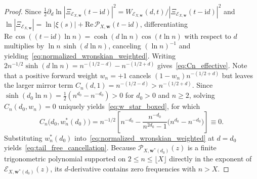 \documentclass[11pt,reqno]{amsart}
\theoremstyle{definition}
\theoremstyle{remark}
\numberwithin{equation}{section}
\newcommand{\ii}{\mathrm{i}}
\newcommand{\Rea}{\mathrm{Re}}
\begin{document}
\begin{proof}
Since $\frac{1}{2}\partial_d\ln|\Xi_{\mathcal{E}_{X,\mathbf{w}}}(t-\ii d)|^2 =\allowbreak W_{\mathcal{E}_{X,\mathbf{w}}}(d,t)/\allowbreak|\Xi_{\mathcal{E}_{X,\mathbf{w}}}(t-\ii d)|^2$ and $\ln|\Xi_{\mathcal{E}_{X,\mathbf{w}}}| =\allowbreak \ln|\xi(s)| +\allowbreak \Rea\,\mathcal{P}_{X,\mathbf{w}}(t-\ii d)$, differentiating $\Rea\,\cos((t-\ii d)\ln n) =\allowbreak \cosh(d\ln n)\cos(t\ln n)$ with respect to $d$ multiplies by $\ln n\,\sinh(d\ln n)$, canceling $(\ln n)^{-1}$ and yielding~\eqref{eq:normalized_wronskian_weighted}. Writing $2n^{-1/2}\sinh(d\ln n) =\allowbreak n^{-(1/2-d)} - n^{-(1/2+d)}$ gives~\eqref{eq:Cn_effective}. Note that a positive forward weight $w_n = +1$ cancels $(1-w_n)n^{-(1/2+d)}$ but leaves the larger mirror term $C_n(d,1) =\allowbreak n^{-(1/2-d)} >\allowbreak n^{-(1/2+d)}$. Since $\sinh(d_0\ln n) =\allowbreak \frac{1}{2}(n^{d_0} - n^{-d_0}) > 0$ for $d_0 > 0$ and $n \ge 2$, solving $C_n(d_0, w_n) = 0$ uniquely yields~\eqref{eq:w_star_boxed}, for which
\[
C_n\bigl(d_0, w_n^*(d_0)\bigr) = n^{-1/2}\left[n^{-d_0} - \frac{n^{-d_0}}{n^{2d_0}-1}\bigl(n^{d_0} - n^{-d_0}\bigr)\right] \equiv 0.
\]
Substituting $w_n^*(d_0)$ into~\eqref{eq:normalized_wronskian_weighted} at $d = d_0$ yields~\eqref{eq:tail_free_cancellation}. Because $\mathcal{P}_{X,\mathbf{w}^*(d_0)}(z)$ is a finite trigonometric polynomial supported on $2 \le n \le \lfloor X\rfloor$ directly in the exponent of $\mathcal{E}_{X,\mathbf{w}^*(d_0)}(z)$, its $d$-derivative contains zero frequencies with $n > X$.
\end{proof}
\end{document}
